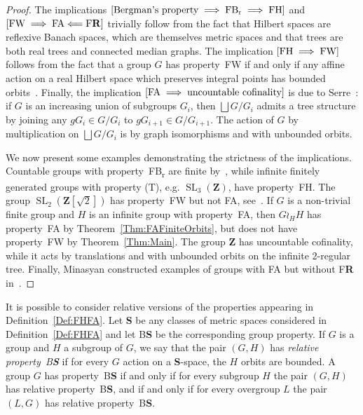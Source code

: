 \documentclass[a4paper]{article}
\newcommand{\PH}[1]{\todo[color={blue!33},size=small]{\textbf{PH :} #1}}
\theoremstyle{definition}
\DeclareMathOperator\SL{SL}
\newcommand*{\field}[1]{\mathbf{#1}}
\newcommand*{\category}[1]{\textbf{#1}}
\newcommand*{\CatS}{\category{S}}
\newcommand*{\Z}{\field{Z}}
\newcommand*{\BS}{B\textbf{S}}
\newcommand*{\FB}{FB\textsubscript{r}}
\newcommand*{\FH}{FH}
\newcommand*{\FW}{FW}
\newcommand*{\FA}{FA}
\newcommand*{\FR}{F\textbf{R}}
\begin{document}
\begin{proof}
The implications $[\textnormal{Bergman's property}\implies \textnormal{\FB}\implies\textnormal{\FH}]$ and $[\textnormal{\FW}\implies \textnormal{\FA}\Longleftarrow\textnormal{\FR}]$ trivially follow from the fact that Hilbert spaces are reflexive Banach spaces, which are themselves metric spaces and that trees are both real trees and connected median graphs.
The implication $[\textnormal{\FH}\implies \textnormal{\FW}]$ follows from the fact that a group $G$ has property~\FW{} if and only if any affine action on a real Hilbert space which preserves integral points has bounded orbits~\cite{Cornulier2013}.
Finally, the implication $[\textnormal{\FA}\implies\textnormal{uncountable cofinality}]$ is due to Serre~\cite{MR0476875}: if $G$ is an increasing union of subgroups $G_i$, then $\bigsqcup G/G_i$ admits a tree structure by joining any $gG_i\in G/G_i$ to $gG_{i+1}\in G/G_{i+1}$.
The action of $G$ by multiplication on $\bigsqcup G/G_i$ is by graph isomorphisms and with unbounded orbits.


We now present some examples demonstrating the strictness of the implications. %
Countable groups with property~\FB{} are finite by~\cite{MR2137870}, while infinite finitely generated groups with property (T), e.g. $\SL_3(\Z)$, have property~\FH.
The group $\SL_2(\Z[\sqrt{2}])$ has property~\FW{} but not \FA, see~\cite{MR3299841}.
If $G$ is a non-trivial finite group and $H$ is an infinite group with property~\FA, then $G\wr_HH$ has property~\FA{} by Theorem~\ref{Thm:FAFiniteOrbits}, but does not have property~\FW{} by Theorem~\ref{Thm:Main}.
The group $\Z$ has uncountable cofinality, while it acts by translations and with unbounded orbits on the infinite $2$-regular tree.
Finally, Minasyan constructed examples of groups with \FA{} but without \FR{} in~\cite{MR3465847}.
\end{proof}
%
%
It is possible to consider relative versions of the properties appearing in Definition~\ref{Def:FHFA}.
Let \CatS{} be any classes of metric spaces considered in Definition~\ref{Def:FHFA} and let \BS{} be the corresponding group property.\PH{Ajouté cette phrase pour clarifier.}
If $G$ is a group and $H$ a subgroup of $G$, we say that the pair $(G,H)$ has \emph{relative property~\BS} if for every $G$ action on a \CatS-space, the $H$ orbits are bounded.
A group $G$ has property~\BS{} if and only if for every subgroup $H$ the pair $(G,H)$ has relative property~\BS{}, and if and only if for every overgroup $L$ the pair $(L,G)$ has relative property~\BS.
%
%
%
%
%
%
%
%
%
\end{document}
